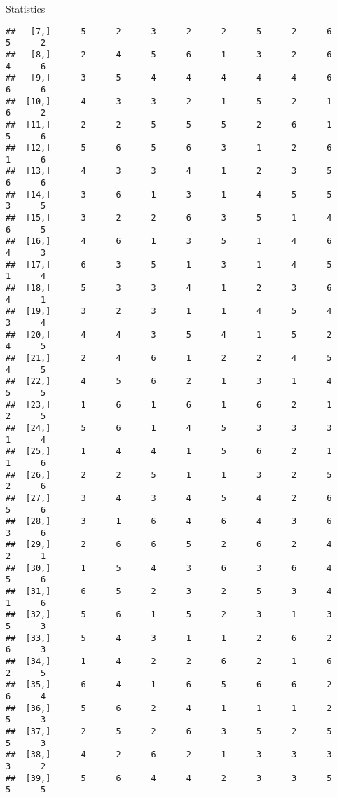 \documentclass[
  ignorenonframetext,
]{beamer}
\begin{document}
\begin{frame}[fragile]{Statistics}
\begin{verbatim}
##   [7,]      5      2      3      2      2      5      2      6      5      2
##   [8,]      2      4      5      6      1      3      2      6      4      6
##   [9,]      3      5      4      4      4      4      4      6      6      6
##  [10,]      4      3      3      2      1      5      2      1      6      2
##  [11,]      2      2      5      5      5      2      6      1      5      6
##  [12,]      5      6      5      6      3      1      2      6      1      6
##  [13,]      4      3      3      4      1      2      3      5      6      6
##  [14,]      3      6      1      3      1      4      5      5      3      5
##  [15,]      3      2      2      6      3      5      1      4      6      5
##  [16,]      4      6      1      3      5      1      4      6      4      3
##  [17,]      6      3      5      1      3      1      4      5      1      4
##  [18,]      5      3      3      4      1      2      3      6      4      1
##  [19,]      3      2      3      1      1      4      5      4      3      4
##  [20,]      4      4      3      5      4      1      5      2      4      5
##  [21,]      2      4      6      1      2      2      4      5      4      5
##  [22,]      4      5      6      2      1      3      1      4      5      5
##  [23,]      1      6      1      6      1      6      2      1      2      5
##  [24,]      5      6      1      4      5      3      3      3      1      4
##  [25,]      1      4      4      1      5      6      2      1      1      6
##  [26,]      2      2      5      1      1      3      2      5      2      6
##  [27,]      3      4      3      4      5      4      2      6      5      6
##  [28,]      3      1      6      4      6      4      3      6      3      6
##  [29,]      2      6      6      5      2      6      2      4      2      1
##  [30,]      1      5      4      3      6      3      6      4      5      6
##  [31,]      6      5      2      3      2      5      3      4      1      6
##  [32,]      5      6      1      5      2      3      1      3      5      3
##  [33,]      5      4      3      1      1      2      6      2      6      3
##  [34,]      1      4      2      2      6      2      1      6      2      5
##  [35,]      6      4      1      6      5      6      6      2      6      4
##  [36,]      5      6      2      4      1      1      1      2      5      3
##  [37,]      2      5      2      6      3      5      2      5      5      3
##  [38,]      4      2      6      2      1      3      3      3      3      2
##  [39,]      5      6      4      4      2      3      3      5      5      5

\end{verbatim}
\end{frame}
\end{document}
